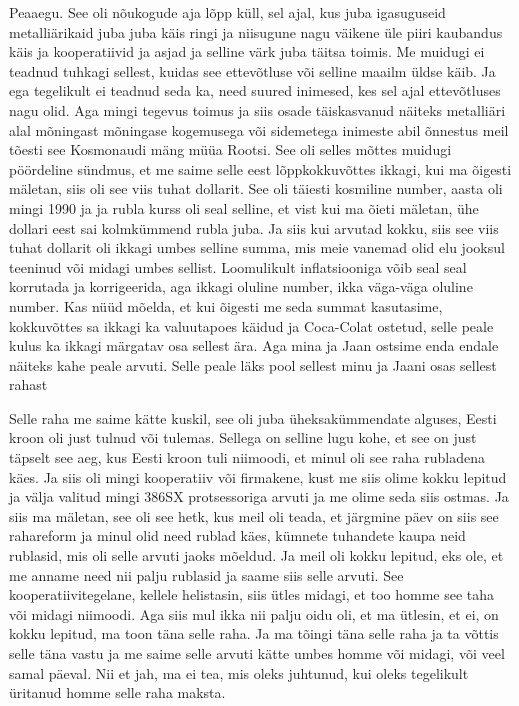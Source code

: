 Peaaegu. See oli nõukogude aja lõpp küll, sel ajal, kus juba igasuguseid 
metalliärikaid juba juba käis ringi ja niisugune nagu väikene üle piiri  
kaubandus käis ja kooperatiivid ja asjad ja selline värk juba täitsa toimis. Me 
muidugi ei teadnud tuhkagi sellest, kuidas  see  ettevõtluse või selline maailm 
üldse käib. Ja ega tegelikult ei teadnud seda ka, need suured inimesed, kes sel 
ajal ettevõtluses nagu  olid. Aga mingi tegevus toimus ja siis osade  
täiskasvanud näiteks metalliäri alal mõningast mõningase kogemusega või 
sidemetega inimeste abil õnnestus meil tõesti see Kosmonaudi mäng müüa Rootsi. 
See oli selles mõttes muidugi pöördeline sündmus, et me saime selle eest 
lõppkokkuvõttes ikkagi, kui ma õigesti mäletan, siis oli see viis tuhat 
dollarit. See oli täiesti kosmiline number,  aasta oli mingi 1990 ja ja  rubla 
kurss oli seal selline, et vist kui ma õieti mäletan, ühe dollari eest sai 
kolmkümmend rubla juba. Ja siis kui arvutad kokku, siis see viis tuhat dollarit 
oli ikkagi umbes selline summa, mis meie vanemad olid elu jooksul teeninud või 
midagi umbes sellist. Loomulikult inflatsiooniga võib seal seal korrutada ja 
korrigeerida, aga ikkagi  oluline number, ikka väga-väga oluline number. Kas 
nüüd mõelda, et kui õigesti me seda summat  kasutasime, kokkuvõttes sa ikkagi 
ka valuutapoes käidud ja Coca-Colat ostetud, selle peale kulus ka ikkagi 
märgatav osa sellest ära. Aga mina ja Jaan ostsime enda endale näiteks kahe 
peale arvuti. Selle peale läks pool sellest  minu ja Jaani osas sellest rahast 


Selle raha me saime kätte kuskil, see oli juba üheksakümmendate alguses,  Eesti 
kroon oli just tulnud või tulemas. Sellega on selline lugu kohe, et see on just 
täpselt see aeg, kus Eesti kroon tuli niimoodi, et minul oli see raha rubladena 
käes. Ja siis oli mingi kooperatiiv või firmakene, kust me siis olime kokku 
lepitud ja välja valitud mingi 386SX protsessoriga arvuti ja me olime seda siis 
ostmas. Ja siis ma mäletan, see oli see hetk, kus meil oli teada, et järgmine 
päev on siis see rahareform ja minul olid need rublad käes, kümnete tuhandete 
kaupa neid rublasid, mis oli selle arvuti jaoks mõeldud. Ja meil oli kokku 
lepitud, eks ole, et me anname need nii palju rublasid ja saame siis selle 
arvuti. See kooperatiivitegelane, kellele helistasin, siis ütles midagi, et too 
homme see taha või midagi niimoodi. Aga siis mul ikka nii palju oidu oli, et ma 
ütlesin, et ei, on kokku lepitud, ma toon täna selle raha. Ja ma tõingi täna 
selle raha ja ta võttis selle täna vastu ja me saime selle arvuti kätte umbes 
homme või midagi, või veel samal päeval. Nii et jah, ma ei tea, mis oleks 
juhtunud, kui oleks tegelikult üritanud homme selle raha  maksta. 

